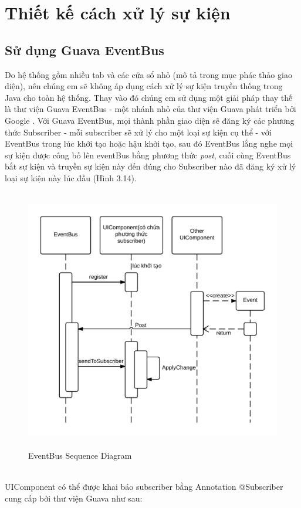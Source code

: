 {\section{Thiết kế cách xử lý sự kiện}
\subsection{Sử dụng Guava EventBus}
Do hệ thống gồm nhiều tab và các cửa sổ nhỏ (mô tả trong mục phác thảo giao diện), nên chúng em sẽ không áp dụng cách xử lý sự kiện truyền thống trong Java cho toàn hệ thống. Thay vào đó chúng em sử dụng một giải pháp thay thế là thư viện Guava EventBus - một nhánh nhỏ của thư viện Guava phát triển bởi Google \cite{guava}. Với Guava EventBus, mọi thành phần giao diện sẽ đăng ký các phương thức Subscriber - mỗi subscriber sẽ xử lý cho một loại sự kiện cụ thể -  với EventBus trong lúc khởi tạo hoặc hậu khởi tạo, sau đó EventBus lắng nghe mọi sự kiện được công bố lên eventBus bằng phương thức \textit{post}, cuối cùng EventBus bắt sự kiện và truyền sự kiện này đến đúng cho Subscriber nào đã đăng ký xử lý loại sự kiện này lúc đầu (Hình 3.14).
\begin{figure}[h!]
	\centering
	\includegraphics[height=115mm]{Figures/uml_eventbus_sequence.png}
	\caption{EventBus Sequence Diagram \label{overflow}}
\end{figure}
\\
UIComponent có thể được khai báo subscriber bằng Annotation @Subscriber cung cấp bởi thư viện Guava như sau:
\begin{verbatim}

\end{verbatim}}

